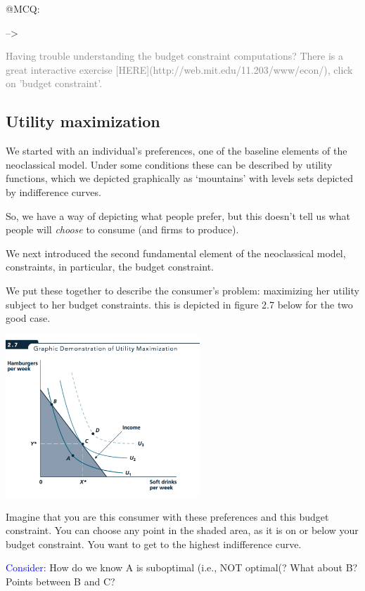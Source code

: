 \documentclass[]{article}
\begin{document}
@MCQ:

--\textgreater{}

\textcolor{gray}{Having trouble understanding the budget constraint computations? There is a great interactive exercise [HERE](http://web.mit.edu/11.203/www/econ/), click on 'budget constraint'.}

\hypertarget{utility-maximization}{%
\subsection{Utility maximization}\label{utility-maximization}}

We started with an individual's preferences, one of the baseline
elements of the neoclassical model. Under some conditions these can be
described by utility functions, which we depicted graphically as
`mountains' with levels sets depicted by indifference curves.

So, we have a way of depicting what people prefer, but this doesn't tell
us what people will \emph{choose} to consume (and firms to produce).

We next introduced the second fundamental element of the neoclassical
model, constraints, in particular, the budget constraint.

We put these together to describe the consumer's problem: maximizing her
utility subject to her budget constraints. this is depicted in figure
2.7 below for the two good case.

\includegraphics[height=2.4in]{picsfigs/utilmax.png}

Imagine that you are this consumer with these preferences and this
budget constraint. You can choose any point in the shaded area, as it is
on or below your budget constraint. You want to get to the highest
indifference curve.

\textcolor{blue}{Consider:} How do we know A is suboptimal (i.e., NOT
optimal(? What about B? Points between B and C?
\end{document}
